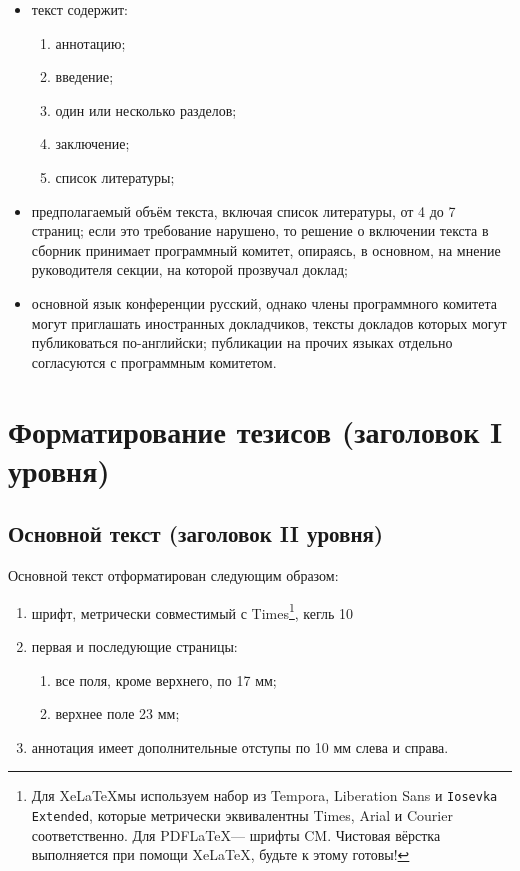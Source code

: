 \documentclass{math-mech-sci}
\begin{document}
\begin{itemize}
\item
  текст содержит:
  \begin{enumerate}
  \item
    аннотацию;
  \item
    введение;
  \item
    один или несколько разделов;
  \item
    заключение;
  \item
    список литературы;
  \end{enumerate}
\item
  предполагаемый объём текста, включая список литературы, от 4 до 7 страниц;
  если это требование нарушено, то решение о включении текста в
  сборник принимает программный комитет, опираясь, в основном, на
  мнение руководителя секции, на которой прозвучал доклад;
\item
  основной язык конференции русский, однако члены программного
  комитета могут приглашать иностранных докладчиков, тексты докладов
  которых могут публиковаться по-английски; публикации на прочих языках
  отдельно согласуются с программным комитетом.
\end{itemize}

\section{Форматирование тезисов (заголовок I уровня)}

\subsection{Основной текст (заголовок II уровня)}

Основной текст отформатирован следующим образом:

\begin{enumerate}
\item
  шрифт, метрически совместимый с Times\footnote{Для \ifxetex \XeLaTeX \else Xe\LaTeX \fi мы используем набор из Tempora, \textsf{Liberation Sans} и \texttt{Iosevka Extended}, которые метрически эквивалентны Times, Arial и Courier соответственно. Для PDF\LaTeX --- шрифты CM.  Чистовая вёрстка
  выполняется при помощи \ifxetex \XeLaTeX \else Xe\LaTeX \fi, будьте к этому готовы!}, кегль 10
\item
  первая и последующие страницы:

  \begin{enumerate}
  \item
    все поля, кроме верхнего, по 17 мм;
  \item
    верхнее поле 23 мм;
  \end{enumerate}
\item
  аннотация имеет дополнительные отступы по 10 мм слева и справа.
\end{enumerate}
\end{document}
